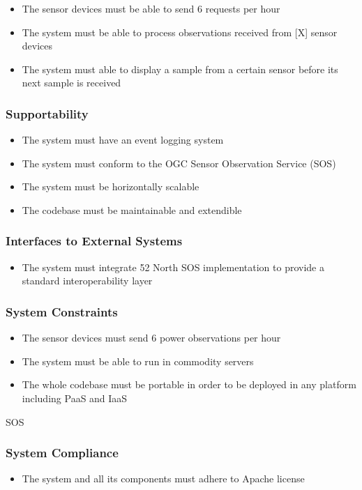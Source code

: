 \begin{itemize}
	\item The sensor devices must be able to send 6 requests per hour
	\item The system must be able to process observations received from [X] sensor devices
	\item The system must able to display a sample from a certain sensor before its next sample is received
\end{itemize}

\subsubsection*{Supportability}

\begin{itemize}
	\item The system must have an event logging system
	\item The system must conform to the OGC Sensor Observation Service (SOS)
	\item The system must be horizontally scalable
	\item The codebase must be maintainable and extendible
\end{itemize}

\subsubsection*{Interfaces to External Systems}

\begin{itemize}
	\item The system must integrate 52 North SOS implementation to provide a standard interoperability layer
\end{itemize}

\subsubsection*{System Constraints}

\begin{itemize}
	\item The sensor devices must send 6 power observations per hour
	\item The system must be able to run in commodity servers 
	\item The whole codebase must be portable in order to be deployed in any platform including PaaS and IaaS
\end{itemize}

SOS

\subsubsection*{System Compliance}

\begin{itemize}
	\item The system and all its components must adhere to Apache license
\end{itemize}




